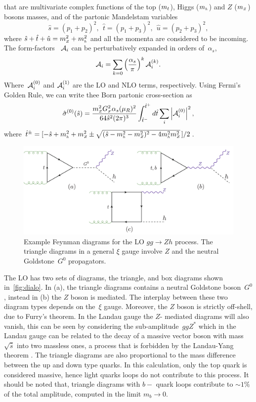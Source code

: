  that are multivariate complex functions of the
top ($m_t$), Higgs ($m_{ \scriptscriptstyle h}$) and $Z$ ($m_{ \scriptscriptstyle Z}$) bosons masses, and of
the partonic Mandelstam variables
\begin{equation}
\hat{s}=(p_1+p_2)^2,~~ \hat{t}=(p_1+p_3)^2,~~ \hat{u}=(p_2+p_3)^2,
\end{equation}
where $\hat{s}+\hat{t}+\hat{u}=m_{ \scriptscriptstyle Z}^2+m_{ \scriptscriptstyle h}^2$ and all the momenta are considered to
be incoming. 
The form-factors~ ${\cal A}_i$ can be perturbatively expanded in orders of~$\alpha_s$, 
\begin{equation}
{\cal A}_{i} = \sum_{k=0} \left(\frac{\alpha_s}{\pi} \right) ^k {\cal A}_i^{(k)}.
\label{eq:ampexp}
\end{equation}
Where~${\cal A}_i^{(0)}$ and ${\cal A}_i^{(1)}$ are the LO and NLO terms, respectively. Using Fermi's Golden Rule, we can write thee Born partonic cross-section as
\begin{equation}
\hat{\sigma}^{(0)}(\hat{s})=
\frac{m_{ \scriptscriptstyle Z}^2 G_{ \scriptscriptstyle F}^2 \alpha_s(\mu_R)^2}{64 \hat{s}^2(2\pi)^3}
\int^{\hat{t}^+}_{\hat{t}^-}d\hat{t}\sum_i \left|{\cal A}_i^{(0)}\right|^2,
\end{equation}
where
$\hat{t}^\pm=[-\hat{s}+m_{ \scriptscriptstyle h}^2+m_{ \scriptscriptstyle Z}^2\pm\sqrt{(\hat{s}-m_{ \scriptscriptstyle h}^2-m_{ \scriptscriptstyle Z}^2)^2-4m_{ \scriptscriptstyle h}^2m_{ \scriptscriptstyle Z}^2}\,]/2$.
\begin{figure}
	\begin{center}
		\includegraphics[width=12cm]{./figures/Feynman_LO}
		\caption{Example Feynman diagrams for the LO $gg \to Zh$ process. The triangle diagrams in a general $\xi$ gauge involve $Z$ and the neutral Goldstone~$G^0$ propagators. }
		\label{fig:dialo}
	\end{center}
\end{figure}
\par The LO has two sets of diagrams, the triangle, and box diagrams shown in~\autoref{fig:dialo}. In (a), the triangle diagrams contains a neutral Goldstone boson~$G^0$, instead in (b) the $Z$ boson is mediated. The interplay between these two diagram types depends on the~$\xi$ gauge. Moreover, the $Z$ boson is strictly off-shell, due to Furry's theorem.
In the Landau gauge the $Z$- mediated diagrams will also vanish, this can be seen by considering the sub-amplitude~$ggZ^*$ which in the Landau gauge can be related to the decay of a massive vector boson
with mass $\sqrt{\hat{s}}$ into two massless ones, a process that is
forbidden by the Landau-Yang theorem \cite{Landau:1948kw,Yang:1950rg}.
The triangle diagrams are also proportional to the mass difference between the up and down type quarks. In this calculation, only the top quark is considered massive, hence light quarks loops do not contribute to this process. It should be noted that, triangle diagrams with $b-$ quark loops contribute to $ \sim 1\%$ of the total amplitude, computed in the limit $m_b \to 0$.  
